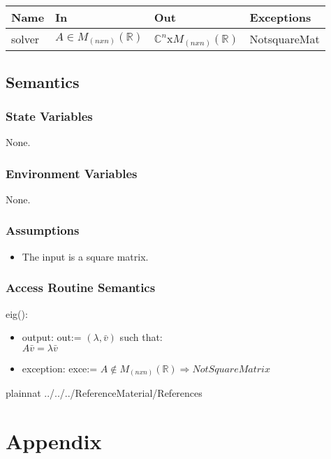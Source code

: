 \documentclass[12pt, titlepage]{article}
\begin{document}
\begin{center}
	\begin{tabular}{p{2cm} p{4cm} p{4cm} p{2cm}}
		\hline
		\textbf{Name} & \textbf{In} & \textbf{Out} & \textbf{Exceptions} \\
		\hline
		solver & $A\in M_{(nxn)}(\mathbb{R})$  & 
		$\mathbb{C}^{n}$x$M_{(nxn)}(\mathbb{R})$ & NotsquareMat \\
		\hline
	\end{tabular}
\end{center}

\subsection{Semantics}

\subsubsection{State Variables}

None.

\subsubsection{Environment Variables}

None.

\subsubsection{Assumptions}

\begin{itemize}
	\item The input is a square matrix. 
\end{itemize}

\subsubsection{Access Routine Semantics}

\noindent eig():
\begin{itemize}
	\item output: out:= $(\lambda, \bar{v})$ such that:\\
	$A\bar{v} = \lambda \bar{v}$ 
	\item exception: exce:= $A \not\in M_{(nxn)}(\mathbb{R}) \Rightarrow 
	NotSquareMatrix$ 
\end{itemize}

\newpage


 {plainnat}
 {../../../ReferenceMaterial/References}

\newpage

\section{Appendix} \label{Appendix}

\end{document}
